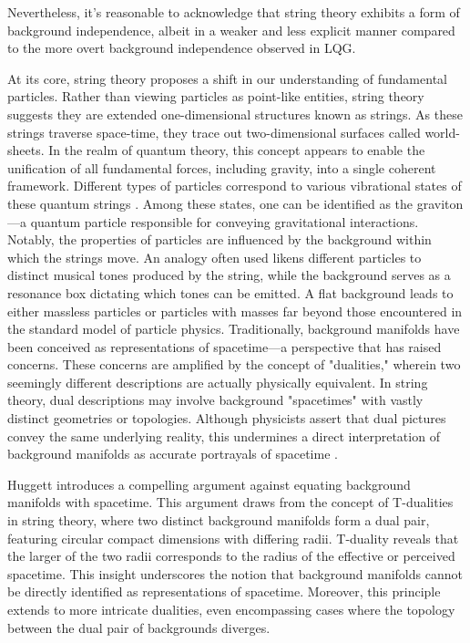 \documentclass[11pt]{article}
\begin{document}
Nevertheless, it's reasonable to acknowledge that string theory exhibits a form of background independence, albeit in a weaker and less explicit manner compared to the more overt background independence observed in LQG.

At its core, string theory proposes a shift in our understanding of fundamental particles. Rather than viewing particles as point-like entities, string theory suggests they are extended one-dimensional structures known as strings. As these strings traverse space-time, they trace out two-dimensional surfaces called world-sheets. In the realm of quantum theory, this concept appears to enable the unification of all fundamental forces, including gravity, into a single coherent framework. Different types of particles correspond to various vibrational states of these quantum strings \cite{wuthrich2005to}. Among these states, one can be identified as the graviton—a quantum particle responsible for conveying gravitational interactions. Notably, the properties of particles are influenced by the background within which the strings move. An analogy often used likens different particles to distinct musical tones produced by the string, while the background serves as a resonance box dictating which tones can be emitted. A flat background leads to either massless particles or particles with masses far beyond those encountered in the standard model of particle physics. Traditionally, background manifolds have been conceived as representations of spacetime—a perspective that has raised concerns. These concerns are amplified by the concept of "dualities," wherein two seemingly different descriptions are actually physically equivalent. In string theory, dual descriptions may involve background "spacetimes" with vastly distinct geometries or topologies. Although physicists assert that dual pictures convey the same underlying reality, this undermines a direct interpretation of background manifolds as accurate portrayals of spacetime \cite{wuthrich2010no}.

Huggett \cite{huggettforthcoming} introduces a compelling argument against equating background manifolds with spacetime. This argument draws from the concept of T-dualities in string theory, where two distinct background manifolds form a dual pair, featuring circular compact dimensions with differing radii. T-duality reveals that the larger of the two radii corresponds to the radius of the effective or perceived spacetime. This insight underscores the notion that background manifolds cannot be directly identified as representations of spacetime. Moreover, this principle extends to more intricate dualities, even encompassing cases where the topology between the dual pair of backgrounds diverges.
\end{document}
